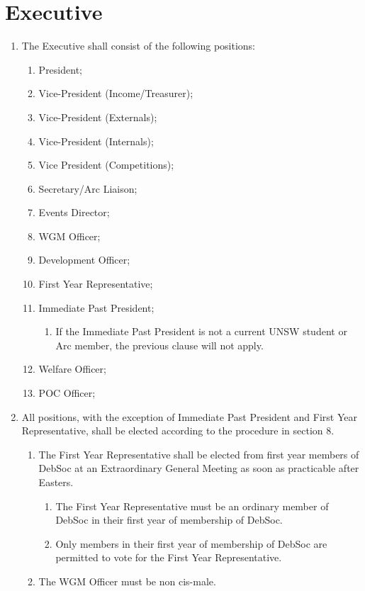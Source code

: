 \newpage
\section{Executive}
\begin{enumerate}
\item The Executive shall consist of the following positions: \label{exec_positions}
  \begin{enumerate}
  \item President;
  \item Vice-President (Income/Treasurer);
  \item Vice-President (Externals);
  \item Vice-President (Internals);
  \item Vice President (Competitions);
  \item Secretary/Arc Liaison;
  \item Events Director;
  \item WGM Officer;
  \item Development Officer;
  \item First Year Representative;
  \item Immediate Past President;
    \begin{enumerate}
    \item If the Immediate Past President is not a current UNSW student or Arc member, the previous clause will not apply.
    \end{enumerate}
  \item Welfare Officer;
  \item POC Officer;
  \end{enumerate}
\item All positions, with the exception of Immediate Past President and First Year Representative, shall be elected according to the procedure in section 8.
  \begin{enumerate}
  \item The First Year Representative shall be elected from first year members of DebSoc at an Extraordinary General Meeting as soon as practicable after Easters.
    \begin{enumerate}
    \item The First Year Representative must be an ordinary member of DebSoc in their first year of membership of DebSoc.
    \item Only members in their first year of membership of DebSoc are permitted to vote for the First Year Representative.
    \end{enumerate}
  \item The WGM Officer must be non cis-male.

\end{enumerate}
\end{enumerate}
